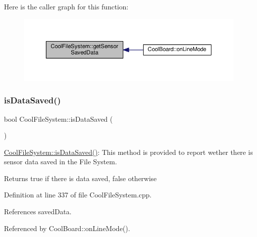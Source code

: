 Here is the caller graph for this function\+:\nopagebreak
\begin{figure}[H]
\begin{center}
\leavevmode
\includegraphics[width=350pt]{classCoolFileSystem_a5c58bca3735c0ed3efb268d70ef998ef_icgraph}
\end{center}
\end{figure}
\mbox{\label{classCoolFileSystem_a5a7eaeea7a9fbf8aaef651d862fa3b5b}} 
\subsubsection{\texorpdfstring{is\+Data\+Saved()}{isDataSaved()}}
{\footnotesize\ttfamily bool Cool\+File\+System\+::is\+Data\+Saved (\begin{DoxyParamCaption}{ }\end{DoxyParamCaption})}

\hyperlink{classCoolFileSystem_a5a7eaeea7a9fbf8aaef651d862fa3b5b}{Cool\+File\+System\+::is\+Data\+Saved()}\+: This method is provided to report wether there is sensor data saved in the File System.

\begin{DoxyReturn}{Returns}
true if there is data saved, false otherwise 
\end{DoxyReturn}


Definition at line 337 of file Cool\+File\+System.\+cpp.



References saved\+Data.



Referenced by Cool\+Board\+::on\+Line\+Mode().


